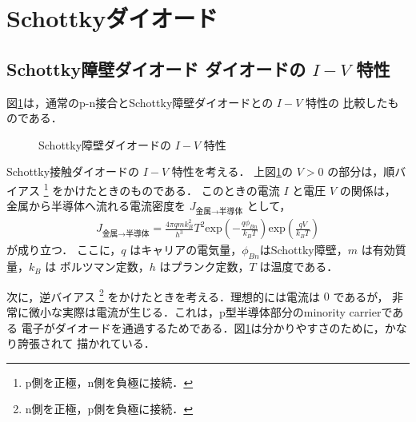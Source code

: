     \section{Schottkyダイオード}
        \subsection{Schottky障壁ダイオード ダイオードの $I-V$ 特性}
        図\ref{fig:Schottky}は，通常のp-n接合とSchottky障壁ダイオードとの $I-V$ 特性の
        比較したものである．
                        \begin{figure}[htbp]
                            \begin{center}
                                \caption{Schottky障壁ダイオードの $I-V$ 特性}
                                \label{fig:Schottky}
                            \end{center}
                        \end{figure}

        Schottky接触ダイオードの $I-V$ 特性を考える．
        上図\ref{fig:Schottky}の $V>0$ の部分は，順バイアス
            \footnote{
                p側を正極，n側を負極に接続．
            }
        をかけたときのものである．
        このときの電流 $I$ と電圧 $V$ の関係は，
        金属から半導体へ流れる電流密度を $J_{\mbox{金属} \rightarrow \mbox{半導体}}$ として，
        \begin{align}\label{RD_1}
        J_{\mbox{金属} \rightarrow \mbox{半導体}}
        =\frac{4\pi qmk_{B}^{2}}{h^{3}}T^{2}
        \mathrm{exp}\left(-\frac{q\phi_{Bn}}{k_{B}T}\right)
        \mathrm{exp}\left(\frac{qV}{k_{B}T}\right)
        \end{align}
        が成り立つ．
        ここに，$q$ はキャリアの電気量，$\phi_{Bn}$はSchottky障壁，$m$ は有効質量，$k_{B}$ は
        ボルツマン定数，$h$ はプランク定数，$T$ は温度である．

        次に，逆バイアス
            \footnote{
                n側を正極，p側を負極に接続．
            }
        をかけたときを考える．理想的には電流は $0$ であるが，
        非常に微小な実際は電流が生じる．これは，p型半導体部分のminority carrierである
        電子がダイオードを通過するためである．図\ref{fig:Schottky}は分かりやすさのために，かなり誇張されて
        描かれている．

